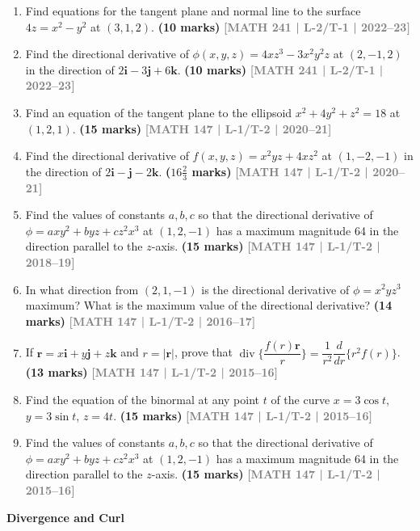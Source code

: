 \documentclass[12pt,a4paper]{article}
\newcommand{\yr}[1]{\hfill\textcolor{gray}{\small\textbf{[#1]}}}
\newcommand{\mk}[1]{\textcolor{orange!70!black}{\small\textbf{(#1 marks)}}}
\newcommand{\subtopic}[2]{%
  \vspace{10pt}
  \noindent\begin{tcolorbox}[colback=#1!8,colframe=#1,boxrule=0.6pt,arc=4pt,
    left=6pt,right=6pt,top=4pt,bottom=4pt]
    \small\bfseries\textcolor{#1}{#2}
  \end{tcolorbox}
  \vspace{2pt}
}
\begin{document}
\begin{enumerate}
\item Find equations for the tangent plane and normal line to the surface $4z=x^{2}-y^{2}$ at $(3,1,2)$.
\mk{10} \yr{MATH 241 | L-2/T-1 | 2022--23}

\item Find the directional derivative of $\phi(x,y,z)=4xz^{3}-3x^{2}y^{2}z$ at $(2,-1,2)$ in the direction of $2\mathbf{i}-3\mathbf{j}+6\mathbf{k}$.
\mk{10} \yr{MATH 241 | L-2/T-1 | 2022--23}

\item Find an equation of the tangent plane to the ellipsoid $x^{2}+4y^{2}+z^{2}=18$ at $(1,2,1)$.
\mk{15} \yr{MATH 147 | L-1/T-2 | 2020--21}

\item Find the directional derivative of $f(x,y,z)=x^{2}yz+4xz^{2}$ at $(1,-2,-1)$ in the direction of $2\mathbf{i}-\mathbf{j}-2\mathbf{k}$.
\mk{$16\tfrac{2}{3}$} \yr{MATH 147 | L-1/T-2 | 2020--21}

\item Find the values of constants $a,b,c$ so that the directional derivative of $\phi=axy^{2}+byz+cz^{2}x^{3}$ at $(1,2,-1)$ has a maximum magnitude 64 in the direction parallel to the $z$-axis.
\mk{15} \yr{MATH 147 | L-1/T-2 | 2018--19}

\item In what direction from $(2,1,-1)$ is the directional derivative of $\phi=x^{2}yz^{3}$ maximum? What is the maximum value of the directional derivative?
\mk{14} \yr{MATH 147 | L-1/T-2 | 2016--17}

\item If $\mathbf{r}=x\mathbf{i}+y\mathbf{j}+z\mathbf{k}$ and $r=|\mathbf{r}|$, prove that $\operatorname{div}\{\dfrac{f(r)\mathbf{r}}{r}\}=\dfrac{1}{r^{2}}\dfrac{d}{dr}\{r^{2}f(r)\}$.
\mk{13} \yr{MATH 147 | L-1/T-2 | 2015--16}

\item Find the equation of the binormal at any point $t$ of the curve $x=3\cos t$, $y=3\sin t$, $z=4t$.
\mk{15} \yr{MATH 147 | L-1/T-2 | 2015--16}

\item Find the values of constants $a,b,c$ so that the directional derivative of $\phi=axy^{2}+byz+cz^{2}x^{3}$ at $(1,2,-1)$ has a maximum magnitude 64 in the direction parallel to the $z$-axis.
\mk{15} \yr{MATH 147 | L-1/T-2 | 2015--16}

\end{enumerate}

\subtopic{cD}{Divergence and Curl}
\label{sub:s4-divcurl}
\end{document}
